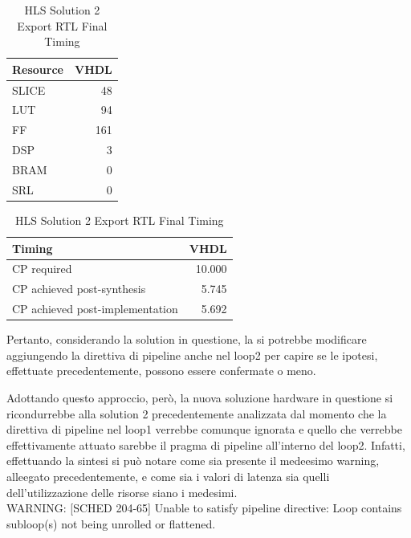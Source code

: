 \begin{table}[H]
	\centering
	\begin{minipage}[t]{0.45\linewidth}
		\centering
		\begin{tabular}{|l|r|}
			\hline
			\textbf{Resource} & \textbf{VHDL} \\
			\hline
			SLICE & 48 \\
			\hline
			LUT & 94 \\
			\hline
			FF & 161 \\
			\hline
			DSP & 3 \\
			\hline
			BRAM & 0 \\
			\hline
			SRL & 0 \\
			\hline
		\end{tabular}
		\caption{HLS Solution 2t Export RTL Resource Usage}
		\label{tab:hls-solution-2-export-rtl-resoruce-usage}
	\end{minipage}
	\hfill
	\begin{minipage}[t]{0.45\linewidth}
		\centering
		\begin{tabular}{|l|r|}
			\hline
			\textbf{Timing} & \textbf{VHDL} \\
			\hline
			CP required & 10.000 \\
			\hline
			CP achieved post-synthesis & 5.745 \\
			\hline
			CP achieved post-implementation & 5.692 \\
			\hline
		\end{tabular}
		\caption{HLS Solution 2 Export RTL Final Timing}
		\label{tab:hls-solution-2-export-rtl-final-timing}
	\end{minipage}
\end{table}


Pertanto, considerando la solution in questione, la si potrebbe modificare aggiungendo la direttiva di pipeline anche nel loop2 per capire se le ipotesi, effettuate precedentemente, possono essere confermate o meno. 



Adottando questo approccio, però, la nuova soluzione hardware in questione si ricondurrebbe alla solution 2 precedentemente analizzata dal momento che la direttiva di pipeline nel loop1 verrebbe comunque ignorata e quello che verrebbe effettivamente attuato sarebbe il pragma di pipeline all'interno del loop2. Infatti, effettuando la sintesi si può notare come sia presente il medeesimo warning, alleegato precedentemente, e come sia i valori di latenza sia quelli dell'utilizzazione delle risorse siano i medesimi.
\\
WARNING: [SCHED 204-65] Unable to satisfy pipeline directive: Loop contains subloop(s) not being unrolled or flattened.

